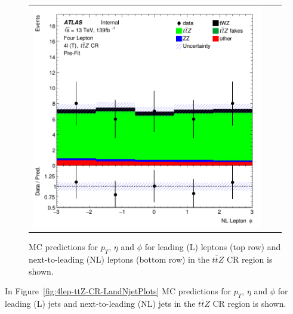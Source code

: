 \begin{figure}[htbp]
\begin{tabular}{ccc}
    \includegraphics[width=.3\textwidth]{figures/PreFitPlots/lep4_ttZ_4T_NL_lepton_phi.png} \\

  \end{tabular}
    \caption{MC predictions for $p_{T}$, $\eta$ and $\phi$ for leading (L) leptons (top row) and next-to-leading (NL) leptons (bottom row) in the $t\bar{t}Z$ CR region  is shown.}
  \label{fig:4lep-ttZ-CR-leptonPlots}
\end{figure}

In Figure~\ref{fig:4lep-ttZ-CR-LandNjetPlots} MC predictions for $p_{T}$, $\eta$ and $\phi$ for leading (L) jets and next-to-leading (NL) jets in the $t\bar{t}Z$ CR region is shown.

